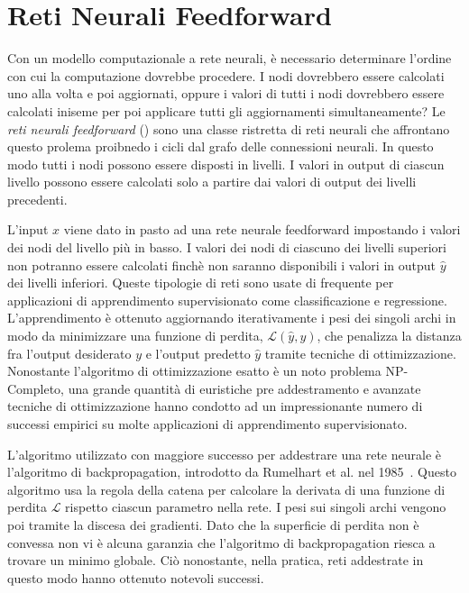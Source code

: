 \section{Reti Neurali Feedforward}
Con un modello computazionale a rete neurali, \`e necessario determinare l'ordine con cui la computazione dovrebbe procedere.
I nodi dovrebbero essere calcolati uno alla volta e poi aggiornati, oppure i valori di tutti i nodi dovrebbero essere calcolati iniseme per poi applicare tutti gli aggiornamenti simultaneamente?
Le \emph{reti neurali feedforward} () sono una classe ristretta di reti neurali che affrontano questo prolema proibnedo i cicli dal grafo delle connessioni neurali.
In questo modo tutti i nodi possono essere disposti in livelli.
I valori in output di ciascun livello possono essere calcolati solo a partire dai valori di output dei livelli precedenti.

L'input $x$ viene dato in pasto ad una rete neurale feedforward impostando i valori dei nodi del livello pi\`u in basso.
I valori dei nodi di ciascuno dei livelli superiori non potranno essere calcolati finch\`e non saranno disponibili i valori in output $\hat{y}$ dei livelli inferiori.
Queste tipologie di reti sono usate di frequente per applicazioni di apprendimento supervisionato come classificazione e regressione.
L'apprendimento \`e ottenuto aggiornando iterativamente i pesi dei singoli archi in modo da minimizzare una funzione di perdita, $\mathcal{L}(\hat{y},y)$, che penalizza la distanza fra l'output desiderato $y$ e l'output predetto $\hat{y}$ tramite tecniche di ottimizzazione.
Nonostante l'algoritmo di ottimizzazione esatto \`e un noto problema NP-Completo, una grande quantit\`a di euristiche pre addestramento e avanzate tecniche di ottimizzazione hanno condotto ad un impressionante numero di successi empirici su molte applicazioni di apprendimento supervisionato.

L'algoritmo utilizzato con maggiore successo per addestrare una rete neurale \`e l'algoritmo di backpropagation, introdotto da Rumelhart et al. nel 1985~\cite{Rumelhart:1985}.
Questo algoritmo usa la regola della catena per calcolare la derivata di una funzione di perdita $\mathcal{L}$ rispetto ciascun parametro nella rete.
I pesi sui singoli archi vengono poi tramite la discesa dei gradienti.
Dato che la superficie di perdita non \`e convessa non vi \`e alcuna garanzia che l'algoritmo di backpropagation riesca a trovare un minimo globale.
Ci\`o nonostante, nella pratica, reti addestrate in questo modo hanno ottenuto notevoli successi.

